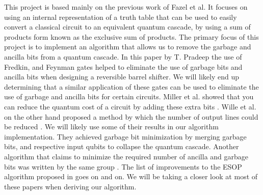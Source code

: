 \documentclass{IEEEtran}
\begin{document}
This project is based mainly on the previous work of Fazel et al. \cite{4313212} It focuses on using an internal representation of a truth table that can be used to easily convert a classical circuit to an equivalent quantum cascade, by using a sum of products form known as the exclusive sum of products. The primary focus of this project is to implement an algorithm that allows us to remove the garbage and ancilla bits from a quantum cascade. In this paper by T. Pradeep \cite{6320760} the use of Fredkin, and Feynman gates helped to eliminate the use of garbage bits and ancilla bits when designing a reversible barrel shifter. We will likely end up determining that a similar application of these gates can be used to eliminate the use of garbage and ancilla bits for certain circuits. Miller et al. showed that you can reduce the quantum cost of a circuit by adding these extra bits \cite{5489136}. Wille et al. on the other hand proposed a method by which the number of output lines could be reduced \cite{Wille:2010:RNL:1837274.1837439}. We will likely use some of their results in our algorithm implementation. They achieved garbage bit minimization by merging garbage bits, and respective input qubits to collapse the quantum cascade. Another algorithm that claims to minimize the required number of ancilla and garbage bits was written by the same group \cite{6165069}. The list of improvements to the ESOP algorithm proposed in \cite{4313212} goes on and on. We will be taking a closer look at most of these papers when deriving our algorithm.

{}




\end{document}
